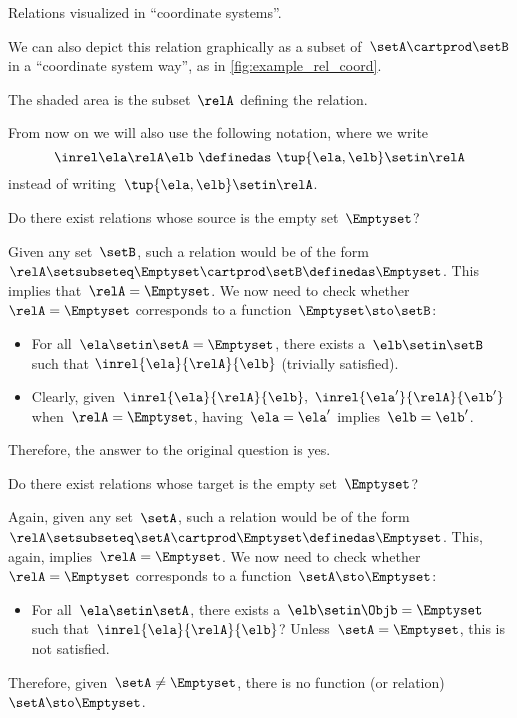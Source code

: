 \begin{marginfigure}
    \centering
    \caption{Relations visualized in ``coordinate systems''.}
    \label{fig:example_rel_coord}
\end{marginfigure}

We can also depict this relation graphically as a subset of~$\setA \cartprod \setB$ in a ``coordinate system way'', as in \cref{fig:example_rel_coord}.

The shaded area is the subset~$\relA$ defining the relation.

\begin{remark}
    From now on we will also use the following notation, where we write
    \begin{equation}
        \inrel \ela \relA \elb \ \definedas\  \tup{\ela,\elb}\setin \relA
    \end{equation}
    instead of writing~$\tup{\ela,\elb}\setin \relA$.
\end{remark}

\begin{exercise}
    Do there exist relations whose source is the empty set~$\Emptyset$?
\end{exercise}
\begin{solution}
    Given any set~$\setB$, such a relation would be of the form~$\relA \setsubseteq \Emptyset \cartprod \setB \definedas \Emptyset$.
    This implies that~$\relA=\Emptyset$.
    We now need to check whether~$\relA=\Emptyset$ corresponds to a function~$\Emptyset\sto \setB$:
    \begin{itemize}
        \item For all~$\ela\setin \setA=\Emptyset$, there exists a~$\elb \setin \setB$ such that $\inrel{\ela}{\relA}{\elb}$ (trivially satisfied).
        \item Clearly, given~$\inrel{\ela}{\relA}{\elb},~\inrel{\ela'}{\relA}{\elb'}$ when~$\relA=\Emptyset$, having~$\ela=\ela'$ implies~$\elb=\elb'$.
    \end{itemize}
    Therefore, the answer to the original question is yes.
\end{solution}

\begin{exercise}
    Do there exist relations whose target is the empty set~$\Emptyset$?
\end{exercise}
\begin{solution}
    Again, given any set~$\setA$, such a relation would be of the form~$\relA \setsubseteq \setA \cartprod \Emptyset\definedas \Emptyset$.
    This, again, implies~$\relA=\Emptyset$.
    We now need to check whether~$\relA=\Emptyset$ corresponds to a function~$\setA \sto \Emptyset$:
    \begin{itemize}
        \item For all~$\ela\setin \setA$, there exists a~$\elb\setin \Objb=\Emptyset$ such that~$\inrel{\ela}{\relA}{\elb}$?
              Unless~$\setA=\Emptyset$, this is not satisfied.
    \end{itemize}
    Therefore, given~$\setA \neq \Emptyset$, there is no function (or relation)~$\setA \sto \Emptyset$.
\end{solution}

